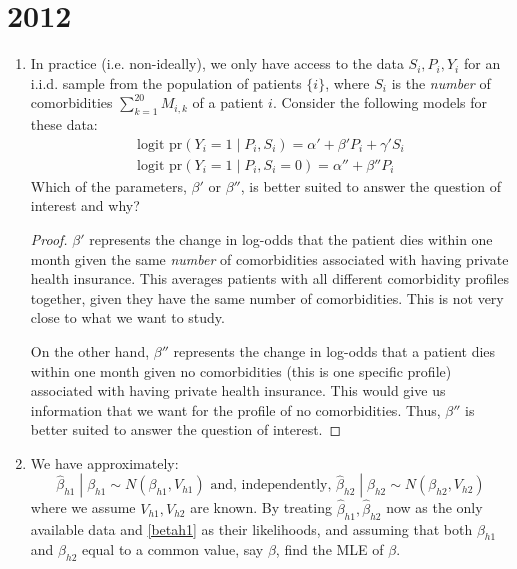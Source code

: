 \documentclass[letterpaper, 12pt]{article}
\newcommand{\pr}{\text{pr}}
\newcommand{\sbs}{\;|\;} %
\begin{document}
\section{2012}
\begin{enumerate}
\item
In practice (i.e. non-ideally), we only have access to the data $S_i, P_i, Y_i$ for an i.i.d. sample from the population of patients $\{i\}$, where $S_i$ is the \textit{number} of comorbidities $\sum_{k=1}^{20} M_{i,k}$ of a patient $i$. Consider the following models for these data:
\begin{gather}
\text{logit } \pr(Y_i=1 \sbs P_i,S_i) = \alpha' + \beta' P_i + \gamma' S_i
\\
\text{logit } \pr(Y_i=1 \sbs P_i,S_i = 0) = \alpha'' + \beta'' P_i
\end{gather}
Which of the parameters, $\beta'$ or $\beta''$, is better suited to answer the question of interest and why?

\begin{proof}
$\beta'$ represents the change in log-odds that the patient dies within one month given the same \textit{number} of comorbidities associated with having private health insurance. This averages patients with all different comorbidity profiles together, given they have the same number of comorbidities. This is not very close to what we want to study.

On the other hand, $\beta''$ represents the change in log-odds that a patient dies within one month given no comorbidities (this is one specific profile) associated with having private health insurance. This would give us information that we want for the profile of no comorbidities. Thus, $\beta''$ is better suited to answer the question of interest.
\end{proof}
\item
We have approximately:
\begin{equation}
\label{betah1}
\hat{\beta}_{h1} \sbs \beta_{h1} \sim N(\beta_{h1}, V_{h1})
\text{ and, independently, }
\hat{\beta}_{h2} \sbs \beta_{h2} \sim N(\beta_{h2}, V_{h2})
\end{equation}
where we assume $V_{h1}, V_{h2}$ are known. By treating $\hat{\beta}_{h1},\hat{\beta}_{h2}$ now as the only available data and \eqref{betah1} as their
likelihoods, and assuming that both $\beta_{h1}$ and $\beta_{h2}$ equal to a common value, say $\beta$, find the MLE of $\beta$.


\end{enumerate}
\end{document}

